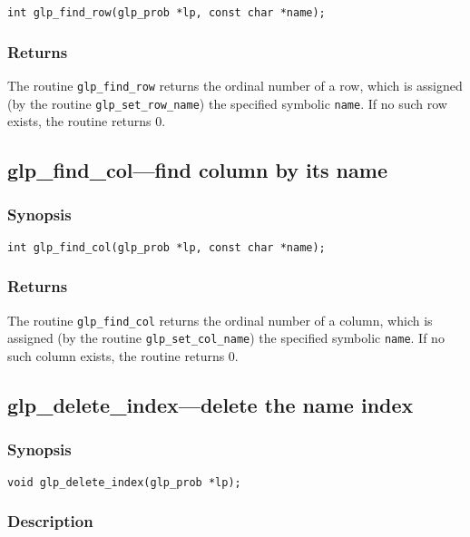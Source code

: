\begin{verbatim}
int glp_find_row(glp_prob *lp, const char *name);
\end{verbatim}

\subsubsection*{Returns}

The routine \verb|glp_find_row| returns the ordinal number of a row,
which is assigned (by the routine \verb|glp_set_row_name|) the specified
symbolic \verb|name|. If no such row exists, the routine returns 0.

\subsection{glp\_find\_col---find column by its name}

\subsubsection*{Synopsis}

\begin{verbatim}
int glp_find_col(glp_prob *lp, const char *name);
\end{verbatim}

\subsubsection*{Returns}

The routine \verb|glp_find_col| returns the ordinal number of a column,
which is assigned (by the routine \verb|glp_set_col_name|) the specified
symbolic \verb|name|. If no such column exists, the routine returns 0.

\subsection{glp\_delete\_index---delete the name index}

\subsubsection*{Synopsis}

\begin{verbatim}
void glp_delete_index(glp_prob *lp);
\end{verbatim}

\subsubsection*{Description}

